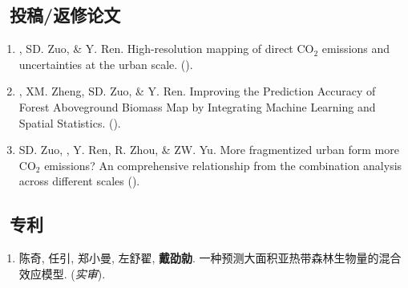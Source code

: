 \subsection*{\texorpdfstring{\faBook\ 投稿/返修论文}{投稿/返修论文}}
\begin{enumerate}
\item
    \Shaoqing, SD. Zuo, \& Y. Ren.
    High-resolution mapping of direct CO$_2$ emissions and uncertainties at the urban scale. 
    (\Submitted).
\item
    \Shaoqing\CF, XM. Zheng, SD. Zuo, \& Y. Ren.
    Improving the Prediction Accuracy of Forest Aboveground Biomass Map by Integrating Machine Learning and Spatial Statistics. 
    (\Submitted).
\item
    SD. Zuo, \Shaoqing, Y. Ren, R. Zhou, \&  ZW. Yu.
    More fragmentized urban form more CO$_2$ emissions? An comprehensive relationship from the combination analysis across different scales 
    (\Revision).
\end{enumerate}
\subsection*{\texorpdfstring{\faBook\ 专利}{专利}}
\begin{enumerate}
\item
     陈奇, 任引, 郑小曼, 左舒翟, \textbf{戴劭勍}.
     一种预测大面积亚热带森林生物量的混合效应模型.
     (\textit{实审}).
\end{enumerate}